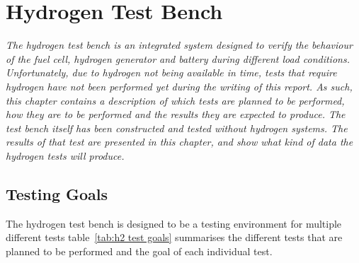 
\section{Hydrogen Test Bench}

\emph{The hydrogen test bench is an integrated system designed to verify the behaviour of the fuel cell, hydrogen generator and battery during different load conditions. Unfortunately, due to hydrogen not being available in time, tests that require hydrogen have not been performed yet during the writing of this report. As such, this chapter contains a description of which tests are planned to be performed, how they are to be performed and the results they are expected to produce. The test bench itself has been constructed and tested without hydrogen systems. The results of that test are presented in this chapter, and show what kind of data the hydrogen tests will produce.}

\subsection*{Testing Goals}
The hydrogen test bench is designed to be a testing environment for multiple different tests table~\ref{tab:h2 test goals} summarises the different tests that are planned to be performed and the goal of each individual test.

